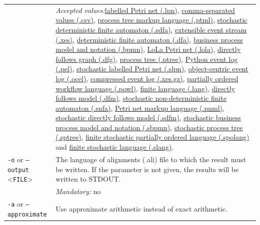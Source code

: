 {\begin{tabularx}{\linewidth}{lX}
&\textit{Accepted values:}\quad \hyperref[filehandler:labelled Petri net]{labelled Petri net (.lpn)}, \hyperref[filehandler:comma-separated values]{comma-separated values (.csv)}, \hyperref[filehandler:process tree markup language]{process tree markup language (.ptml)}, \hyperref[filehandler:stochastic deterministic finite automaton]{stochastic deterministic finite automaton (.sdfa)}, \hyperref[filehandler:extensible event stream]{extensible event stream (.xes)}, \hyperref[filehandler:deterministic finite automaton]{deterministic finite automaton (.dfa)}, \hyperref[filehandler:business process model and notation]{business process model and notation (.bpmn)}, \hyperref[filehandler:LoLa Petri net]{LoLa Petri net (.lola)}, \hyperref[filehandler:directly follows graph]{directly follows graph (.dfg)}, \hyperref[filehandler:process tree]{process tree (.ptree)}, \hyperref[filehandler:Python event log]{Python event log (.pel)}, \hyperref[filehandler:stochastic labelled Petri net]{stochastic labelled Petri net (.slpn)}, \hyperref[filehandler:object-centric event log]{object-centric event log (.ocel)}, \hyperref[filehandler:compressed event log]{compressed event log (.xes.gz)}, \hyperref[filehandler:partially ordered workflow language]{partially ordered workflow language (.powl)}, \hyperref[filehandler:finite language]{finite language (.lang)}, \hyperref[filehandler:directly follows model]{directly follows model (.dfm)}, \hyperref[filehandler:stochastic non-deterministic finite automaton]{stochastic non-deterministic finite automaton (.snfa)}, \hyperref[filehandler:Petri net markup language]{Petri net markup language (.pnml)}, \hyperref[filehandler:stochastic directly follows model]{stochastic directly follows model (.sdfm)}, \hyperref[filehandler:stochastic business process model and notation]{stochastic business process model and notation (.sbpmn)}, \hyperref[filehandler:stochastic process tree]{stochastic process tree (.sptree)}, \hyperref[filehandler:finite stochastic partially ordered language]{finite stochastic partially ordered language (.spolang)} and \hyperref[filehandler:finite stochastic language]{finite stochastic language (.slang)}.\\
\texttt{-o} or \texttt{--output} <\texttt{FILE}> &
The language of alignments (.ali) file to which the result must be written. If the parameter is not given, the results will be written to STDOUT.\\
&\textit{Mandatory:} \quad no\\
\texttt{-a} or \texttt{--approximate} & Use approximate arithmetic instead of exact arithmetic.\\

\end{tabularx}}
